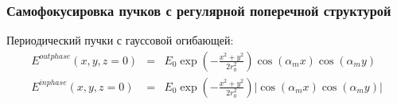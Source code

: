 \documentclass[fullscreen=true,unicode,bookmarks=true]{beamer}
\begin{document}
    \begin{frame}
        \frametitle{Самофокусировка пучков с регулярной поперечной структурой}

        Периодический пучки с гауссовой огибающей:
        \begin{eqnarray*}
          	E^{outphase}(x, y, z = 0) & = & E_0 \exp\left( -\frac{x^2+y^2}{2 r_0^2} \right) \cos(\alpha_m x) \cos(\alpha_m y) \\
           	E^{inphase}(x, y, z = 0) & = & E_0 \exp\left( -\frac{x^2+y^2}{2 r_0^2} \right) \left| \cos(\alpha_m x) \cos(\alpha_m y) \right|
        \end{eqnarray*}

		\vspace{-2em}

        \begin{figure}[H]
            \begin{center}
                \begin{minipage}[h]{0.4\linewidth}
                \end{minipage}
            \end{center}
        \end{figure}
    \end{frame}	
\end{document}
